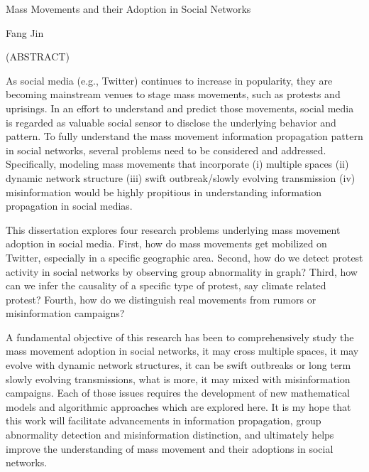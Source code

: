 \documentclass[12pt,dvips]{report}
\begin{document}
\thispagestyle{empty}
\begin{center}

{\large
Mass Movements and their Adoption in Social Networks
}

\vfill

Fang Jin

\vfill

(ABSTRACT)
\vfill

\end{center}
As social media (e.g., Twitter) continues to increase in popularity, they are becoming mainstream venues to stage mass movements, such as protests and uprisings. In an effort to understand and predict those movements, social media is regarded as valuable social sensor to disclose the underlying behavior and pattern. To fully understand the mass movement information propagation pattern in social networks, several problems need to be considered and addressed. Specifically, modeling mass movements that incorporate (i) multiple spaces (ii) dynamic network structure (iii) swift outbreak/slowly evolving transmission (iv) misinformation would be highly propitious in understanding information propagation in social medias.

This dissertation explores four research problems underlying mass movement adoption in social media. First, how do mass movements get mobilized on Twitter, especially in a specific geographic area. Second, how do we detect protest activity in social networks by observing group abnormality in graph? Third, how can we infer the causality of a specific type of protest, say climate related protest? Fourth, how do we distinguish real movements from rumors or misinformation campaigns?

A fundamental objective of this research has been to comprehensively study the mass movement adoption in social networks, it may cross multiple spaces, it may evolve with dynamic network structures, it can be swift outbreaks or long term slowly evolving transmissions, what is more, it may mixed with misinformation campaigns. Each of those issues requires the development of new mathematical models and algorithmic approaches which are explored here.  It is my hope that this work will facilitate advancements in information propagation, group abnormality detection and misinformation distinction, and ultimately helps improve the understanding of mass movement and their adoptions in social networks.
\end{document}
